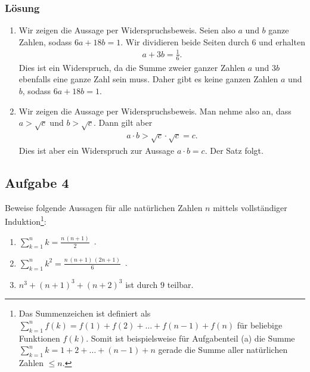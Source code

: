 \documentclass[a4paper,10pt]{article}
\newcommand{\s}[1]{#1}
\begin{document}
\s{\subsubsection*{Lösung}
    \begin{enumerate}[label=(\alph*)]
        \item Wir zeigen die Aussage per Widerspruchsbeweis. Seien also $a$ und $b$ ganze Zahlen, sodass $6a+18b=1.$ Wir dividieren beide Seiten durch $6$ und erhalten
        \begin{align*}
            a+3b=\frac{1}{6}.
        \end{align*}
        Dies ist ein Widerspruch, da die Summe zweier ganzer Zahlen $a$ und $3b$ ebenfalls eine ganze Zahl sein muss. Daher gibt es keine ganzen Zahlen $a$ und $b$, sodass $6a+18b=1$.
        \item Wir zeigen die Aussage per Widerspruchsbeweis. Man nehme also an, dass $a>\sqrt{c}$ und $b>\sqrt{c}$. Dann gilt aber
        \begin{align*}
            a\cdot b > \sqrt{c}\cdot\sqrt{c}=c.
        \end{align*}
        Dies ist aber ein Widerspruch zur Aussage $a\cdot b=c$. Der Satz folgt.
    \end{enumerate}
 }   

  
\subsection*{Aufgabe 4}

Beweise folgende Aussagen für alle natürlichen Zahlen $n$ mittels vollständiger Induktion\footnote{Das Summenzeichen ist definiert als $\sum_{k=1}^n f(k) = f(1) + f(2) + \ldots + f(n-1) + f(n)$ für beliebige Funktionen $f(k)$. Somit ist beispielsweise für Aufgabenteil (a) die Summe $\sum_{k=1}^n k = 1 + 2 + \ldots + (n-1) + n$ gerade die Summe aller natürlichen Zahlen $\le n$.}:

\begin{enumerate}[label=(\alph*)]
	\item $\sum\limits_{k=1}^n k = \frac{n\, (n+1)}{2}$ \,.
	\item $\sum\limits_{k=1}^n k^2 = \frac{n\, (n+1)\,(2n+1)}{6}$ \,.
	\item $n^3 + (n+1)^3 + (n+2)^3$ ist durch $9$ teilbar.
\end{enumerate}
\end{document}
